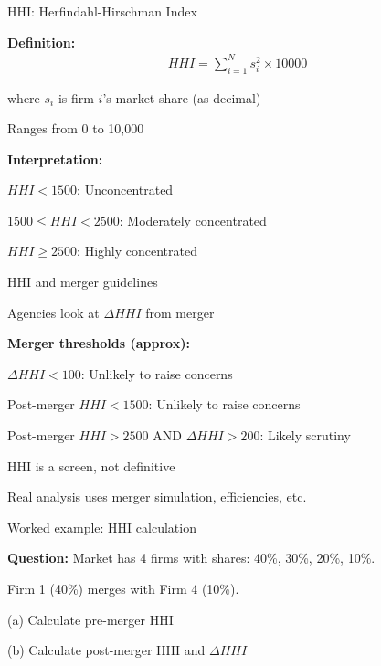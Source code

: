 \documentclass[notes,11pt, aspectratio=169]{beamer}
\newenvironment{wideitemize}{\itemize\addtolength{\itemsep}{10pt}}{\enditemize}
\begin{document}
\begin{frame}{HHI: Herfindahl-Hirschman Index}
	\begin{wideitemize}
		\item \textbf{Definition:}
		\begin{align*}
			HHI = \sum_{i=1}^N s_i^2 \times 10000
		\end{align*}
		\item where $s_i$ is firm $i$'s market share (as decimal)
		\item Ranges from 0 to 10,000
		\item \textbf{Interpretation:}
		\begin{wideitemize}
			\vspace{5pt}
			\item $HHI < 1500$: Unconcentrated
			\item $1500 \leq HHI < 2500$: Moderately concentrated
			\item $HHI \geq 2500$: Highly concentrated
		\end{wideitemize}
	\end{wideitemize}
\end{frame}

\begin{frame}{HHI and merger guidelines}
	\begin{wideitemize}
		\item Agencies look at $\Delta HHI$ from merger
		\item \textbf{Merger thresholds (approx):}
		\begin{wideitemize}
			\vspace{5pt}
			\item $\Delta HHI < 100$: Unlikely to raise concerns
			\item Post-merger $HHI < 1500$: Unlikely to raise concerns
			\item Post-merger $HHI > 2500$ AND $\Delta HHI > 200$: Likely scrutiny
		\end{wideitemize}
		\item HHI is a screen, not definitive
		\item Real analysis uses merger simulation, efficiencies, etc.
	\end{wideitemize}
\end{frame}

\begin{frame}{Worked example: HHI calculation}
	\begin{wideitemize}
		\item \textbf{Question:} Market has 4 firms with shares: 40\%, 30\%, 20\%, 10\%.
		\item Firm 1 (40\%) merges with Firm 4 (10\%).
		\item (a) Calculate pre-merger HHI
		\item (b) Calculate post-merger HHI and $\Delta HHI$
	\end{wideitemize}
\end{frame}
\end{document}
